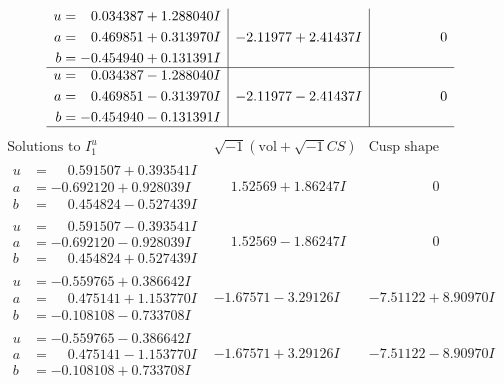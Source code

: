 \documentclass[1p]{elsarticle_modified}
\theoremstyle{definition}
\newcommand{\I}{\sqrt{-1}}
\begin{document}
$$\begin{array}{c|c|c}
\begin{aligned}
u &= \phantom{-}0.034387 + 1.288040 I \\
a &= \phantom{-}0.469851 + 0.313970 I \\
b &= -0.454940 + 0.131391 I\end{aligned}
 & -2.11977 + 2.41437 I & \phantom{-0.000000 } 0 \\ \hline\begin{aligned}
u &= \phantom{-}0.034387 - 1.288040 I \\
a &= \phantom{-}0.469851 - 0.313970 I \\
b &= -0.454940 - 0.131391 I\end{aligned}
 & -2.11977 - 2.41437 I & \phantom{-0.000000 } 0\\
 \hline 
 \end{array}$$\newpage$$\begin{array}{c|c|c}  
\text{Solutions to }I^u_{1}& \I (\text{vol} + \sqrt{-1}CS) & \text{Cusp shape}\\
 \hline 
\begin{aligned}
u &= \phantom{-}0.591507 + 0.393541 I \\
a &= -0.692120 + 0.928039 I \\
b &= \phantom{-}0.454824 - 0.527439 I\end{aligned}
 & \phantom{-}1.52569 + 1.86247 I & \phantom{-0.000000 } 0 \\ \hline\begin{aligned}
u &= \phantom{-}0.591507 - 0.393541 I \\
a &= -0.692120 - 0.928039 I \\
b &= \phantom{-}0.454824 + 0.527439 I\end{aligned}
 & \phantom{-}1.52569 - 1.86247 I & \phantom{-0.000000 } 0 \\ \hline\begin{aligned}
u &= -0.559765 + 0.386642 I \\
a &= \phantom{-}0.475141 + 1.153770 I \\
b &= -0.108108 - 0.733708 I\end{aligned}
 & -1.67571 - 3.29126 I & -7.51122 + 8.90970 I \\ \hline\begin{aligned}
u &= -0.559765 - 0.386642 I \\
a &= \phantom{-}0.475141 - 1.153770 I \\
b &= -0.108108 + 0.733708 I\end{aligned}
 & -1.67571 + 3.29126 I & -7.51122 - 8.90970 I \\ \hline\begin{aligned}

\end{aligned}
\end{array}$$
\end{document}
